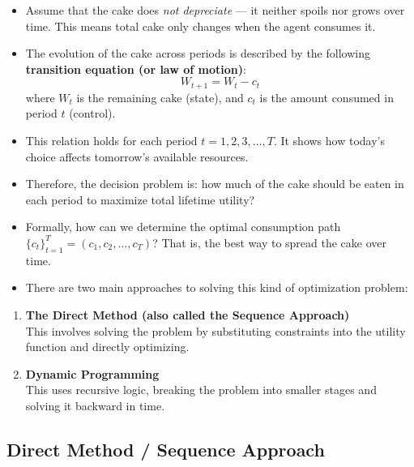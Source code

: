 \documentclass[12pt]{article}
\begin{document}
\begin{itemize}
    \item Assume that the cake does \textit{not depreciate} — it neither spoils nor grows over time. This means total cake only changes when the agent consumes it.

    \item The evolution of the cake across periods is described by the following \textbf{transition equation (or law of motion)}:
    \[
    W_{t+1} = W_t - c_t \tag{1}
    \]
    where \( W_t \) is the remaining cake (state), and \( c_t \) is the amount consumed in period \( t \) (control).

    \item This relation holds for each period \( t = 1, 2, 3, \dots, T \). It shows how today's choice affects tomorrow's available resources.

    \item Therefore, the decision problem is: how much of the cake should be eaten in each period to maximize total lifetime utility?

    \item Formally, how can we determine the optimal consumption path \( \{c_t\}_{t=1}^{T} = (c_1, c_2, \dots, c_T) \)? That is, the best way to spread the cake over time.

    \item There are two main approaches to solving this kind of optimization problem:
\end{itemize}

\begin{enumerate}
    \item \textbf{The Direct Method (also called the Sequence Approach)} \\
    This involves solving the problem by substituting constraints into the utility function and directly optimizing.

    \item \textbf{Dynamic Programming} \\
    This uses recursive logic, breaking the problem into smaller stages and solving it backward in time.
\end{enumerate}

\subsection*{\noindent\textbf{Direct Method / Sequence Approach}}
\end{document}
